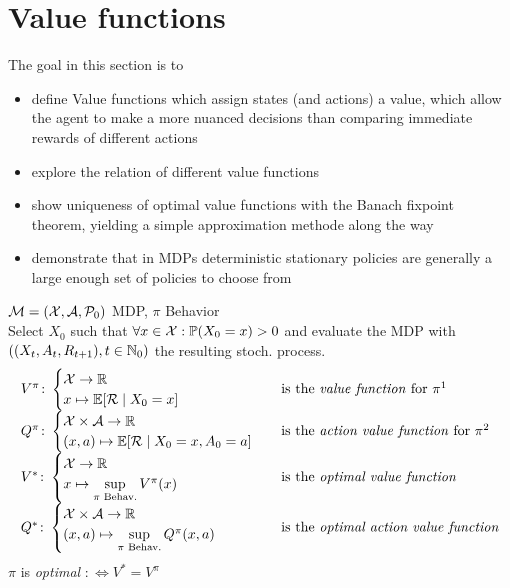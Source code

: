 \section{Value functions}
The goal in this section is to
\begin{itemize}[itemsep=0pt, topsep=1pt]
\item define Value functions which assign states (and actions) a value, which allow the agent to make a more nuanced decisions than comparing immediate rewards of different actions
\item explore the relation of different value functions
\item show uniqueness of optimal value functions with the Banach fixpoint theorem, yielding a simple approximation methode along the way
\item demonstrate that in MDPs deterministic stationary policies are generally a large enough set of policies to choose from
 \end{itemize}
\begin{definition}\(\mathcal{M}=(\mathcal{X},\mathcal{A},\mathcal{P}_0)\) MDP, \(\pi\) Behavior\\
Select \(X_0\) such that \(\forall x\in\mathcal{X}:\mathbb{P}(X_0=x)>0\) and evaluate the MDP with
\(((X_t,A_t,R_{t+1}), t\in \mathbb{N}_0)\) the resulting stoch. process.\\
\def\arraystretch{3}
\[
\begin{array}{l l}
	V^\pi\colon
	\begin{cases}
		\cX\to\R\\
		x\mapsto \E[\cR\mid X_0=x]
	\end{cases} 
	& \text{is the \emph{value function} for } \pi \footnotemark\\
	Q^\pi\colon
	\begin{cases}
		\cX\times\cA\to\R\\
		(x,a)\mapsto \E[\cR\mid X_0=x, A_0=a]
	\end{cases}
	& \text{is the \emph{action value function} for } \pi \footnotemark\\
	V^*\colon
	\begin{cases}
		\cX\to\R\\
		x\mapsto \sup\limits_{\pi\text{ Behav.}} V^\pi(x)
	\end{cases} 
	& \text{is the \emph{optimal value function}}\\
	Q^*\colon
	\begin{cases}
		\cX\times\cA\to\R\\
		(x,a)\mapsto \sup\limits_{\pi\text{ Behav.}} Q^\pi(x,a)
	\end{cases}
	& \text{is the \emph{optimal action value function}}
\end{array}
\]
\(\pi\) is \emph{optimal} \(:\iff V^*=V^\pi\)
\end{definition}
